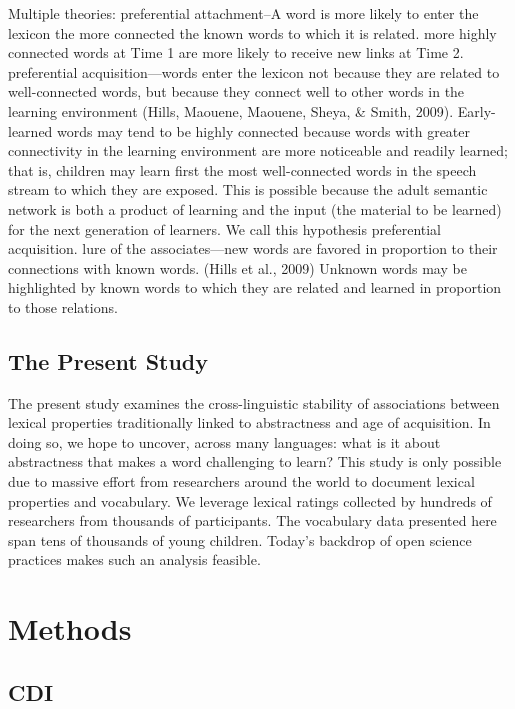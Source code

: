 \documentclass[
  man,floatsintext]{apa6}
\begin{document}
Multiple theories: preferential attachment--A word is more likely to enter the lexicon the more connected the known words to which it is related. more highly connected words at Time 1 are more likely to receive new links at Time 2. preferential acquisition---words enter the lexicon not because they are related to well-connected words, but because they connect well to other words in the learning environment (Hills, Maouene, Maouene, Sheya, \& Smith, 2009). Early-learned words may tend to be highly connected because words with greater connectivity in the learning environment are more noticeable and readily learned; that is, children may learn first the most well-connected words in the speech stream to which they are exposed. This is possible because the adult semantic network is both a product of learning and the input (the material to be learned) for the next generation of learners. We call this hypothesis preferential acquisition. lure of the associates---new words are favored in proportion to their connections with known words. (Hills et al., 2009) Unknown words may be highlighted by known words to which they are related and learned in proportion to those relations.

\hypertarget{the-present-study}{%
\subsection{The Present Study}\label{the-present-study}}

The present study examines the cross-linguistic stability of associations between lexical properties traditionally linked to abstractness and age of acquisition. In doing so, we hope to uncover, across many languages: what is it about abstractness that makes a word challenging to learn? This study is only possible due to massive effort from researchers around the world to document lexical properties and vocabulary. We leverage lexical ratings collected by hundreds of researchers from thousands of participants. The vocabulary data presented here span tens of thousands of young children. Today's backdrop of open science practices makes such an analysis feasible.

\hypertarget{methods}{%
\section{Methods}\label{methods}}

\hypertarget{cdi}{%
\subsection{CDI}\label{cdi}}
\end{document}
